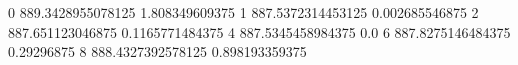 0 889.3428955078125 1.808349609375
1 887.5372314453125 0.002685546875
2 887.651123046875 0.1165771484375
4 887.5345458984375 0.0
6 887.8275146484375 0.29296875
8 888.4327392578125 0.898193359375
